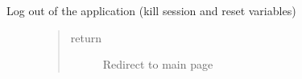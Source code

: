 \documentclass[letterpaper,10pt,english]{sphinxmanual}
\begin{document}

\begin{fulllineitems}
\label{\detokenize{index:views.logout.Logout}}~

\begin{fulllineitems}
\label{\detokenize{index:views.logout.Logout.GET}}~\begin{description}
\item[{Log out of the application (kill session and reset variables)}] \leavevmode\begin{quote}\begin{description}
\item[{return}] \leavevmode
Redirect to main page

\end{description}\end{quote}

\end{description}

\end{fulllineitems}


\end{fulllineitems}

\end{document}
